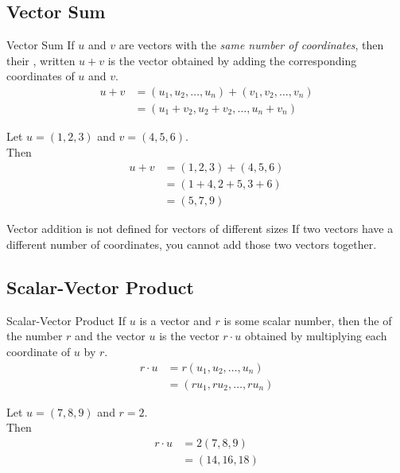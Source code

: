 \documentclass[../notes.tex]{subfiles}
\begin{document}
			\subsection{Vector Sum}
				\begin{definition}{Vector Sum}
					If $u$ and $v$ are vectors with the \emph{same number of coordinates}, then their , written $u + v$ is the vector obtained by adding the corresponding coordinates of $u$ and $v$.
					\begin{align*}
						u + v &= (u_{1}, u_{2}, \ldots, u_{n}) + (v_{1}, v_{2}, \ldots, v_{n})\\
						&= (u_{1} + v_{2}, u_{2} + v_{2}, \ldots, u_{n} + v_{n})
					\end{align*}
				\end{definition}
				\begin{example}[width=0.5\textwidth]
					Let $u = (1, 2, 3)$ and $v = (4, 5, 6)$.\\
					Then 
					\begin{align*}
						u + v &= (1, 2, 3) + (4, 5, 6)\\
						&= (1 + 4, 2 + 5, 3 + 6)\\
						&= (5, 7, 9)
					\end{align*} 
				\end{example}
				\begin{sidenote}{Vector addition is not defined for vectors of different sizes}
					If two vectors have a different number of coordinates, you cannot add those two vectors together.
				\end{sidenote}
			\pagebreak
			\subsection{Scalar-Vector Product}
				\begin{definition}{Scalar-Vector Product}
					If $u$ is a vector and $r$ is some scalar number, then the  of the number $r$ and the vector $u$ is the vector $r \cdot u$ obtained by multiplying each coordinate of $u$ by $r$.
					\begin{align*}
						r\cdot u &= r(u_{1}, u_{2}, \ldots, u_{n})\\
						&= (ru_{1}, ru_{2}, \ldots, ru_{n})
					\end{align*}
				\end{definition}
				\begin{example}[width=0.5\textwidth]
					Let $u = (7, 8, 9)$ and $r = 2$.\\
					Then
					\begin{align*}
						r \cdot u &= 2(7, 8, 9)\\
						&= (14, 16, 18)
					\end{align*}
				\end{example}
\end{document}
